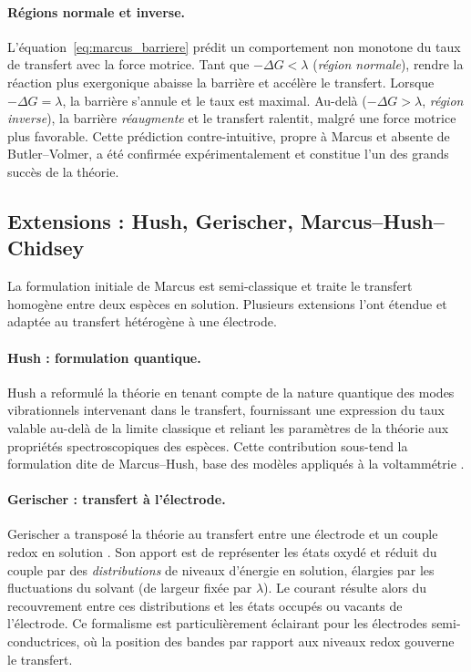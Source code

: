\paragraph{Régions normale et inverse.}
L'équation~\eqref{eq:marcus_barriere} prédit un comportement non monotone du
taux de transfert avec la force motrice. Tant que $-\Delta G < \lambda$
(\emph{région normale}), rendre la réaction plus exergonique abaisse la
barrière et accélère le transfert. Lorsque $-\Delta G = \lambda$, la barrière
s'annule et le taux est maximal. Au-delà ($-\Delta G > \lambda$, \emph{région
inverse}), la barrière \emph{réaugmente} et le transfert ralentit, malgré une
force motrice plus favorable. Cette prédiction contre-intuitive, propre à
Marcus et absente de Butler--Volmer, a été confirmée expérimentalement et
constitue l'un des grands succès de la théorie.

\subsection*{Extensions : Hush, Gerischer, Marcus--Hush--Chidsey}

La formulation initiale de Marcus est semi-classique et traite le transfert
homogène entre deux espèces en solution. Plusieurs extensions l'ont étendue
et adaptée au transfert hétérogène à une électrode.

\paragraph{Hush : formulation quantique.}
Hush a reformulé la théorie en tenant compte de la nature quantique des
modes vibrationnels intervenant dans le transfert, fournissant une expression
du taux valable au-delà de la limite classique et reliant les paramètres de
la théorie aux propriétés spectroscopiques des espèces. Cette contribution
sous-tend la formulation dite de Marcus--Hush, base des modèles appliqués à
la voltammétrie \cite{henstridgeMarcusHushChidsey2012}.

\paragraph{Gerischer : transfert à l'électrode.}
Gerischer a transposé la théorie au transfert entre une électrode et un
couple redox en solution \cite{GeneralitesTransfertDelectrons}. Son apport
est de représenter les états oxydé et réduit du couple par des
\emph{distributions} de niveaux d'énergie en solution, élargies par les
fluctuations du solvant (de largeur fixée par $\lambda$). Le courant résulte
alors du recouvrement entre ces distributions et les états occupés ou vacants
de l'électrode. Ce formalisme est particulièrement éclairant pour les
électrodes semi-conductrices, où la position des bandes par rapport aux
niveaux redox gouverne le transfert.

